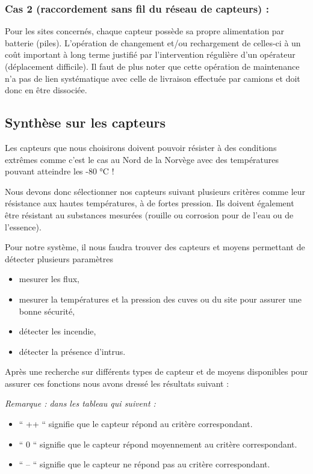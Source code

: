 \documentclass{mise_en_page}
\begin{document}
\subsubsection{Cas 2 (raccordement sans fil du réseau de capteurs) :}

Pour les sites concernés, chaque capteur possède sa propre alimentation
par batterie (piles). L’opération de changement et/ou rechargement de
celles-ci à un coût important à long terme justifié par l’intervention
régulière d’un opérateur (déplacement difficile). Il faut de plus noter
que cette opération de maintenance n’a pas de lien systématique avec
celle de livraison effectuée par camions et doit donc en être
dissociée.

\subsection{Synthèse sur les capteurs}

Les capteurs que nous choisirons doivent pouvoir résister à des
conditions extrêmes comme c’est le cas au Nord de la Norvège avec des
températures pouvant atteindre les -80 °C !

Nous devons donc sélectionner nos capteurs suivant plusieurs critères
comme leur résistance aux hautes températures, à de fortes pression.
Ils doivent également être résistant au substances mesurées (rouille ou
corrosion pour de l’eau ou de l’essence).




Pour notre système, il nous faudra trouver des capteurs et moyens
permettant de détecter plusieurs paramètres

\begin{itemize}
\item mesurer les flux, 
\item mesurer la températures et la pression des cuves ou du site pour
assurer une bonne sécurité,
\item détecter les incendie,
\item détecter la présence d’intrus.
\end{itemize}



Après une recherche sur différents types de capteur et de moyens
disponibles pour assurer ces fonctions nous avons dressé les résultats
suivant :

\emph{Remarque : dans les tableau qui suivent :}
\begin{itemize}
\item  “ ++ “ signifie que le capteur répond au critère correspondant.
\item  “ 0 “ signifie que le capteur répond moyennement au critère
correspondant.
\item  “ -- “ signifie que le capteur ne répond pas au
critère correspondant.
\end{itemize}
\end{document}
